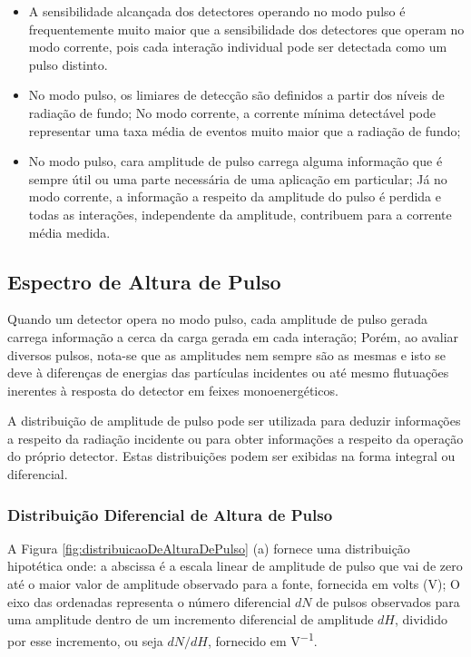 \documentclass[11pt,a4paper]{article}
\begin{document}
			\begin{itemize}
				\item A sensibilidade alcançada dos detectores operando no modo pulso é frequentemente muito maior que a sensibilidade dos detectores que operam no modo corrente, pois cada interação individual pode ser detectada como um pulso distinto.
				\item No modo pulso, os limiares de detecção são definidos a partir dos níveis de radiação de fundo; No modo corrente, a corrente mínima detectável pode representar uma taxa média de eventos muito maior que a radiação de fundo;
				\item No modo pulso, cara amplitude de pulso carrega alguma informação que é sempre útil ou uma parte necessária de uma aplicação em particular; Já no modo corrente, a informação a respeito da amplitude do pulso é perdida e todas as interações, independente da amplitude, contribuem para a corrente média medida. 
			\end{itemize}

	\subsection{Espectro de Altura de Pulso}

		Quando um detector opera no modo pulso, cada amplitude de pulso gerada carrega informação a cerca da carga gerada em cada interação; Porém, ao avaliar diversos pulsos, nota-se que as amplitudes nem sempre são as mesmas e isto se deve à diferenças de energias das partículas incidentes ou até mesmo flutuações inerentes à resposta do detector em feixes monoenergéticos. 

		A distribuição de amplitude de pulso pode ser utilizada para deduzir informações a respeito da radiação incidente ou para obter informações a respeito da operação do próprio detector. Estas distribuições podem ser exibidas na forma integral ou diferencial.



		\subsubsection*{Distribuição Diferencial de Altura de Pulso}

			A Figura \ref{fig:distribuicaoDeAlturaDePulso} (a) fornece uma distribuição hipotética onde: a abscissa é a escala linear de amplitude de pulso que vai de zero até o maior valor de amplitude observado para a fonte, fornecida em volts (V); O eixo das ordenadas representa o número diferencial $dN$  de pulsos observados para uma amplitude dentro de um incremento diferencial de amplitude $dH$, dividido por esse incremento, ou seja $dN/dH$, fornecido em \unit{V^{-1}}.
\end{document}
